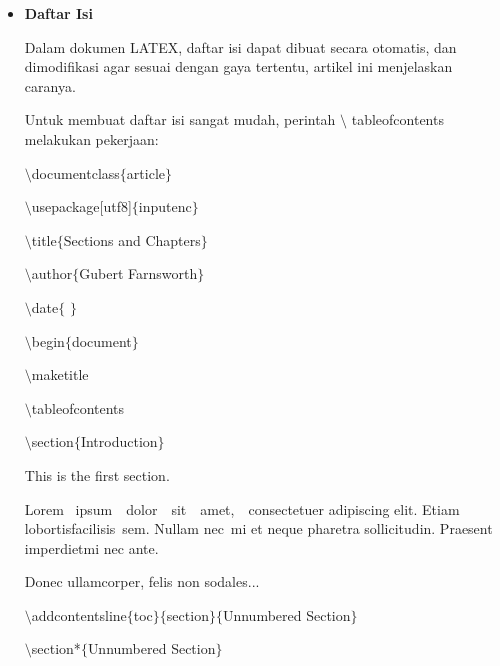 \begin{itemize}
\vspace{12pt}
	\item {\fontsize{14pt}{14pt}\selectfont \textbf{Daftar Isi}}\par

Dalam dokumen LATEX, daftar isi dapat dibuat secara otomatis, dan dimodifikasi agar sesuai dengan gaya tertentu, artikel ini menjelaskan caranya.\par

Untuk membuat daftar isi sangat mudah, perintah $\setminus$ tableofcontents melakukan pekerjaan:\par

\hspace*{0.5in}$\setminus$documentclass$ \{ $article$ \} $\par

$\setminus$usepackage[utf8]$ \{ $inputenc$ \} $\par

$\setminus$title$ \{ $Sections and Chapters$ \} $\par

$\setminus$author$ \{ $Gubert Farnsworth$ \} $\par

$\setminus$date$ \{ $ $ \} $\par

$\setminus$begin$ \{ $document$ \} $\par

$\setminus$maketitle\par

$\setminus$tableofcontents\par

$\setminus$section$ \{ $Introduction$ \} $\par

This is the first section.\par

Lorem~ ipsum~~dolor~~sit~~amet,~~consectetuer  adipiscing  elit.   Etiam~ lobortisfacilisis~sem.  Nullam nec~mi et neque pharetra sollicitudin.  Praesent imperdietmi nec ante. \par

Donec ullamcorper, felis non sodales...\par

$\setminus$addcontentsline$ \{ $toc$ \} $$ \{ $section$ \} $$ \{ $Unnumbered Section$ \} $\par

$\setminus$section*$ \{ $Unnumbered Section$ \} $\par


\end{itemize}
